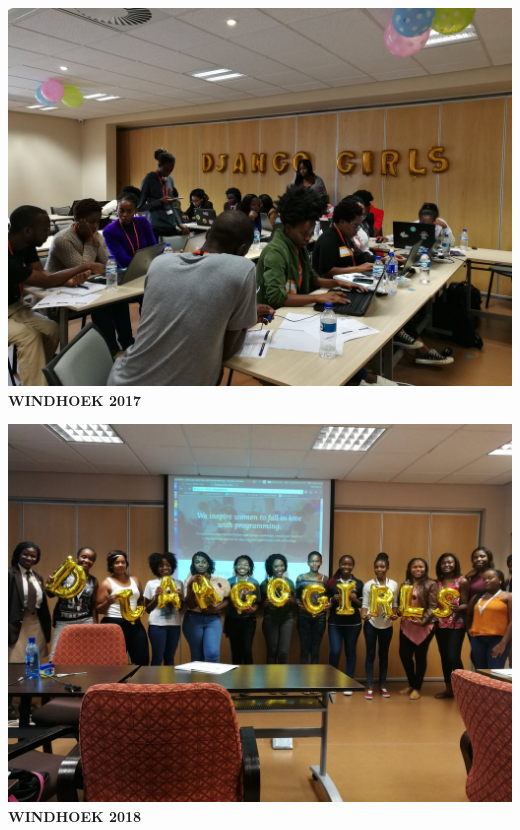 \documentclass{beamer}
\begin{document}
\begin{frame}
    \begin{center}
    \begin{minipage}{.45\textwidth}
        \centering
    \includegraphics[width=\textwidth]{static/windhoek_2017} \\
    \textbf{WINDHOEK 2017}
    \end{minipage}
    \begin{minipage}{.45\textwidth}
        \centering
        \includegraphics[width=\textwidth]{static/windhoek_2018} \\
        \textbf{WINDHOEK 2018}
    \end{minipage}
\end{center}
\end{frame}
\end{document}
